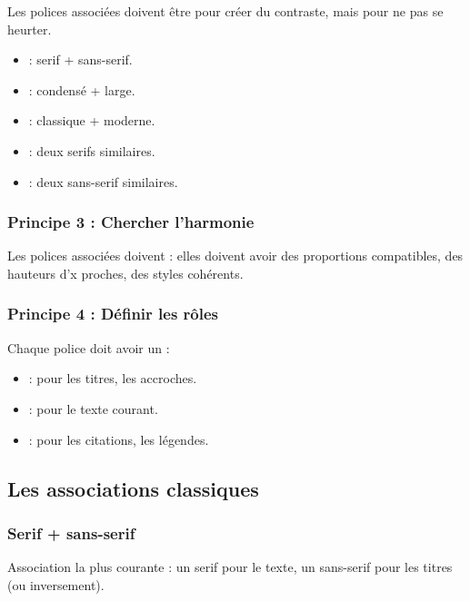 Les polices associées doivent être  pour créer du contraste, mais  pour ne pas se heurter.

\begin{itemize}
    \item {} : serif + sans-serif.
    \item {} : condensé + large.
    \item {} : classique + moderne.
    \item {} : deux serifs similaires.
    \item {} : deux sans-serif similaires.
\end{itemize}

\subsubsection{Principe 3 : Chercher l'harmonie}

Les polices associées doivent  : elles doivent avoir des proportions compatibles, des hauteurs d'x proches, des styles cohérents.

\subsubsection{Principe 4 : Définir les rôles}

Chaque police doit avoir un  :

\begin{itemize}
    \item {} : pour les titres, les accroches.
    \item {} : pour le texte courant.
    \item {} : pour les citations, les légendes.
\end{itemize}

\subsection{Les associations classiques}

\subsubsection{Serif + sans-serif}

Association la plus courante : un serif pour le texte, un sans-serif pour les titres (ou inversement).

